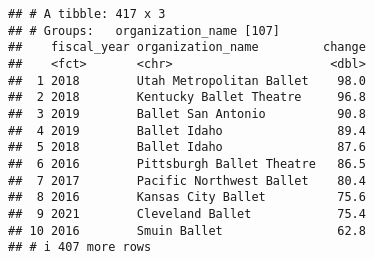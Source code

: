 \documentclass[
]{article}
\begin{document}
\begin{verbatim}
## # A tibble: 417 x 3
## # Groups:   organization_name [107]
##    fiscal_year organization_name         change
##    <fct>       <chr>                      <dbl>
##  1 2018        Utah Metropolitan Ballet    98.0
##  2 2018        Kentucky Ballet Theatre     96.8
##  3 2019        Ballet San Antonio          90.8
##  4 2019        Ballet Idaho                89.4
##  5 2018        Ballet Idaho                87.6
##  6 2016        Pittsburgh Ballet Theatre   86.5
##  7 2017        Pacific Northwest Ballet    80.4
##  8 2016        Kansas City Ballet          75.6
##  9 2021        Cleveland Ballet            75.4
## 10 2016        Smuin Ballet                62.8
## # i 407 more rows
\end{verbatim}
\end{document}

